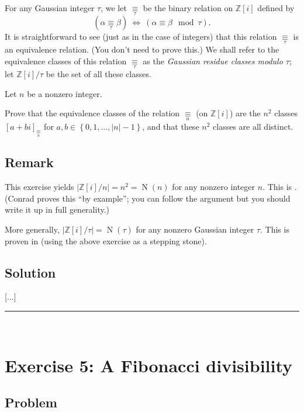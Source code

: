 \documentclass[paper=a4, fontsize=12pt]{scrartcl} %
\newcommand{\ZZ}{\mathbb{Z}} %
\newcommand{\set}[1]{\left\{ #1 \right\}}
\newcommand{\abs}[1]{\left| #1 \right|}
\newcommand{\tup}[1]{\left( #1 \right)}
\newcommand{\ive}[1]{\left[ #1 \right]}
\newcommand{\mapeq}[1]{\underset{#1}{\equiv}}
\newcommand{\N}{\operatorname{N}} %
\newcommand{\horrule}[1]{\rule{\linewidth}{#1}} %
\theoremstyle{plainsl}
\theoremstyle{definition}
\theoremstyle{remark}
\begin{document}
For any Gaussian integer $\tau$, we
let $\mapeq{\tau}$ be the binary relation on
$\ZZ\ive{i}$ defined by
\[
\tup{\alpha \mapeq{\tau} \beta}
\ \iff \ \tup{\alpha \equiv \beta \mod \tau} .
\]
It is straightforward to see (just as in the case of
integers) that this relation $\mapeq{\tau}$ is an
equivalence relation.
(You don't need to prove this.)
We shall refer to the equivalence classes of this
relation $\mapeq{\tau}$ as the \textit{Gaussian
residue classes modulo $\tau$};
let $\ZZ\ive{i} / \tau$ be the set of all these classes.

Let $n$ be a nonzero integer.

Prove that the equivalence classes of the relation
$\mapeq{n}$ (on $\ZZ\ive{i}$) are the $n^2$ classes
$\ive{a + bi}_{\mapeq{n}}$ for
$a, b \in \set{0, 1, \ldots, \abs{n}-1}$,
and that these $n^2$ classes are all distinct.

\subsection{Remark}

This exercise yields
$\abs{\ZZ\ive{i} / n} = n^2 = \N\tup{n}$ for any nonzero
integer $n$.
This is \cite[Lemma 7.15]{Conrad-Gauss}.
(Conrad proves this ``by example''; you can follow the
argument but you should write it up in full generality.)

More generally,
$\abs{\ZZ\ive{i} / \tau} = \N\tup{\tau}$
for any nonzero Gaussian integer $\tau$.
This is proven in \cite[Theorem 7.14]{Conrad-Gauss}
(using the above exercise as a stepping stone).

\subsection{Solution}

[...]

\horrule{0.3pt} \\[0.4cm]

\section{Exercise 5: A Fibonacci divisibility}

\subsection{Problem}
\end{document}
